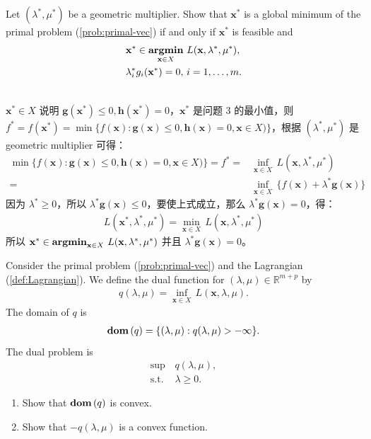 \documentclass[11pt,letter,notitlepage]{article}
\DeclareMathOperator*{\argmin}{\bf argmin}
\DeclareMathOperator*{\dom}{\bf dom\,}
\begin{document}
\newpage
\begin{exercise}
Let $(\lambda^*,\mu^*)$ be a geometric multiplier. Show that $\mathbf{x}^*$ is a global minimum of the primal problem (\ref{prob:primal-vec}) if and only if $\mathbf{x}^*$ is feasible and 
\begin{align*}
	&\mathbf{x}^*\in\argmin_{\mathbf{x}\in X}\,L(\mathbf{x},\lambda^*,\mu^*),\\
	&\lambda_i^*g_i(\mathbf{x}^*)=0,\,i=1,\ldots,m.
\end{align*}
\end{exercise}

\begin{solution}
	\heiti
	\ \\
	$\mathbf{x}^* \in X$ 说明 $\mathbf{g}(\mathbf{x^*}) \leqslant 0, \mathbf{h}(\mathbf{x^*}) = 0$，$\mathbf{x}^*$ 是问题 3 的最小值，则 $f^* = f(\mathbf{x}^*) = \min\{f(\mathbf{x}):\mathbf{g}(\mathbf{x})\leq0,\mathbf{h}(\mathbf{x})=0,\mathbf{x}\in X)\}$，根据 $(\lambda^*,\mu^*)$ 是 geometric multiplier 可得：
	\begin{align*}
		\min\{f(\mathbf{x}):\mathbf{g}(\mathbf{x})\leq0,\mathbf{h}(\mathbf{x})=0,\mathbf{x}\in X)\} = f^* = & \inf_{\mathbf{x}\in X}\,L(\mathbf{x},\lambda^*,\mu^*)\\
		= & \inf_{\mathbf{x}\in X}\,\{f(\mathbf{x})+\lambda^* \mathbf{g}(\mathbf{x})\}
	\end{align*}
	因为 $\lambda^* \geqslant 0$，所以 $\lambda^* \mathbf{g}(\mathbf{x}) \leqslant 0$，要使上式成立，那么 $\lambda^* \mathbf{g}(\mathbf{x}) = 0$，得：
	\begin{align*}
		L(\mathbf{x}^*,\lambda^*,\mu^*) = \min_{\mathbf{x}\in X}\,L(\mathbf{x},\lambda^*,\mu^*)
	\end{align*}
	所以 $\mathbf{x}^*\in\argmin_{\mathbf{x}\in X}\,L(\mathbf{x},\lambda^*,\mu^*)$ 并且 $\lambda^* \mathbf{g}(\mathbf{x}) = 0$。
\end{solution}

\newpage
\begin{exercise}
Consider the primal problem (\ref{prob:primal-vec}) and the Lagrangian (\ref{def:Lagrangian}). We define the dual function for $(\lambda,\mu)\in\mathbb{R}^{m+p}$ by
\begin{align*}
	q(\lambda,\mu)=\inf_{\mathbf{x}\in X}\,L(\mathbf{x},\lambda,\mu).
\end{align*}
The domain of $q$ is 
\begin{align*}
    \dom(q)=\{(\lambda,\mu):q(\lambda,\mu)>-\infty\}.
\end{align*}
The dual problem is
\begin{align*}
	\sup\,&q(\lambda,\mu),\\
	\mbox{s.t. }&\lambda\geq0.
\end{align*}
\begin{enumerate}
    \item Show that $\dom(q)$ is convex.
    \item Show that $-q(\lambda,\mu)$ is a convex function.
\end{enumerate}
\end{exercise}
\end{document}
